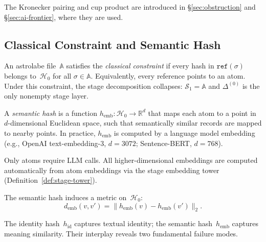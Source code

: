 The Kronecker pairing and cup product are introduced in \S\ref{sec:obstruction} and \S\ref{sec:ai-frontier}, where they are used.


\subsection{Classical Constraint and Semantic Hash}\label{sec:semantic-hash}

\begin{definition}\label{def:classical}
An astrolabe file~$\mathbb{A}$ satisfies the \emph{classical constraint} if every hash in $\texttt{ref}(\sigma)$ belongs to~$\mathcal{H}_0$ for all $\sigma \in \mathbb{A}$. Equivalently, every reference points to an atom. Under this constraint, the stage decomposition collapses: $\mathcal{S}_1 = \mathbb{A}$ and $\Delta^{(0)}$ is the only nonempty stage layer.
\end{definition}

\begin{definition}\label{def:semantic-hash}
A \emph{semantic hash} is a function $h_{\mathrm{emb}}: \mathcal{H}_0 \to \mathbb{R}^d$ that maps each atom to a point in $d$-dimensional Euclidean space, such that semantically similar records are mapped to nearby points. In practice, $h_{\mathrm{emb}}$ is computed by a language model embedding (e.g., OpenAI text-embedding-3, $d=3072$; Sentence-BERT, $d=768$).
\end{definition}

Only atoms require LLM calls. All higher-dimensional embeddings are computed automatically from atom embeddings via the stage embedding tower (Definition~\ref{def:stage-tower}).

\begin{definition}
\label{def:semantic-metric}
The semantic hash induces a metric on~$\mathcal{H}_0$:
\[
  d_{\mathrm{emb}}(v, v') = \|h_{\mathrm{emb}}(v) - h_{\mathrm{emb}}(v')\|_2.
\]
\end{definition}

The identity hash~$h_{\mathrm{id}}$ captures textual identity; the semantic hash~$h_{\mathrm{emb}}$ captures meaning similarity. Their interplay reveals two fundamental failure modes.

